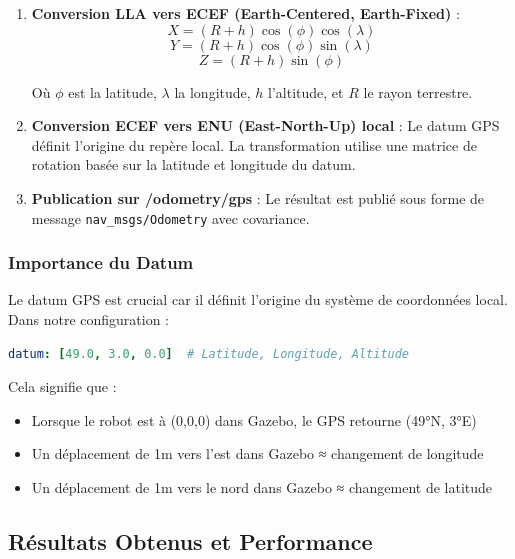 \documentclass[a4paper,12pt]{article}
\begin{document}
\begin{enumerate}
    \item \textbf{Conversion LLA vers ECEF (Earth-Centered, Earth-Fixed)} :
    \begin{equation}
    X = (R + h) \cos(\phi) \cos(\lambda)
    \end{equation}
    \begin{equation}
    Y = (R + h) \cos(\phi) \sin(\lambda)
    \end{equation}
    \begin{equation}
    Z = (R + h) \sin(\phi)
    \end{equation}
    
    Où $\phi$ est la latitude, $\lambda$ la longitude, $h$ l'altitude, et $R$ le rayon terrestre.
    
    \item \textbf{Conversion ECEF vers ENU (East-North-Up) local} :
    Le datum GPS définit l'origine du repère local. La transformation utilise une matrice de rotation basée sur la latitude et longitude du datum.
    
    \item \textbf{Publication sur /odometry/gps} :
    Le résultat est publié sous forme de message \texttt{nav\_msgs/Odometry} avec covariance.
\end{enumerate}

\subsubsection{Importance du Datum}

Le datum GPS est crucial car il définit l'origine du système de coordonnées local. Dans notre configuration :

\begin{lstlisting}[language=YAML]
datum: [49.0, 3.0, 0.0]  # Latitude, Longitude, Altitude
\end{lstlisting}

Cela signifie que :
\begin{itemize}
    \item Lorsque le robot est à (0,0,0) dans Gazebo, le GPS retourne (49°N, 3°E)
    \item Un déplacement de 1m vers l'est dans Gazebo ≈ changement de longitude
    \item Un déplacement de 1m vers le nord dans Gazebo ≈ changement de latitude
\end{itemize}

\subsection{Résultats Obtenus et Performance}
\end{document}
